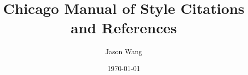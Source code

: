 \documentclass[12pt]{turabian-researchpaper}
\title{Chicago Manual of Style Citations and References}
\author{Jason Wang}
\date{\today}
\begin{document}
\begin{titlepage}
    \maketitle
\end{titlepage}



\newpage
\printbibliography
\end{document}
